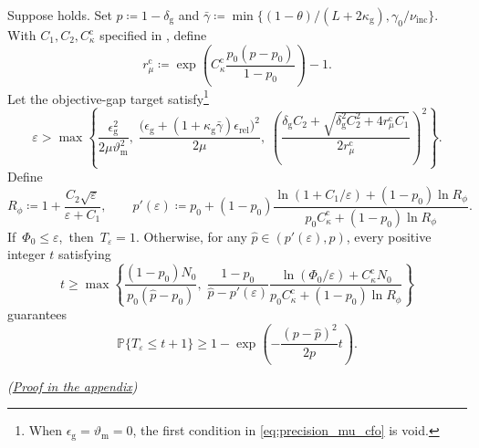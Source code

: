\documentclass{article}
\begin{document}
\begin{theorem}
\label{thm:mu_pos_cfo_bzo}
Suppose  holds. Set
\(p\coloneqq1-\delta_{\mathrm{g}}\) and
\(\bar\gamma\coloneqq\min\{(1-\theta)/(L+2\kappa_{\mathrm{g}}),
\gamma_0/\nu_{\mathrm{inc}}\}\).
With \(C_1,C_2,C_\kappa^{\mathrm{c}}\) specified in
, define
\begin{equation}\label{eq:constants_mu_cfo}
r_\mu^{\mathrm{c}}\coloneqq
\exp\!\left(C_\kappa^{\mathrm{c}}\frac{p_0(p-p_0)}{1-p_0}\right)-1.
\end{equation}
Let the objective-gap target
satisfy\footnote{When \(\epsilon_{\mathrm{g}}=\vartheta_{\mathrm{m}}=0\), the first
condition in \eqref{eq:precision_mu_cfo} is void.}
\begin{equation}\label{eq:precision_mu_cfo}
\varepsilon>\max\left\{
\frac{\epsilon_{\mathrm{g}}^2}{2\mu\vartheta_{\mathrm{m}}^2},\;
\frac{\bigl(\epsilon_{\mathrm{g}}+(1+\kappa_{\mathrm{g}}\bar\gamma)
\epsilon_{\mathrm{rel}}\bigr)^2}{2\mu},\;
\left(
\frac{\delta_{\mathrm{g}}C_2+
\sqrt{\delta_{\mathrm{g}}^2C_2^2+4r_\mu^{\mathrm{c}}C_1}}
{2r_\mu^{\mathrm{c}}}
\right)^2
\right\}.
\end{equation}
Define
\begin{equation}\label{eq:pprime_mu_cfo}
R_\phi\coloneqq1+\frac{C_2\sqrt\varepsilon}{\varepsilon+C_1},
\qquad
p'(\varepsilon)\coloneqq p_0+
(1-p_0)\frac{\ln(1+C_1/\varepsilon)+(1-p_0)\ln R_\phi}
{p_0C_\kappa^{\mathrm{c}}+(1-p_0)\ln R_\phi}.
\end{equation}
\mbox{If \(\Phi_0\le\varepsilon\), then \(T_\varepsilon=1\).} Otherwise,
for any \(\hat p\in(p'(\varepsilon),p)\), every positive integer
\(t\) satisfying
\begingroup{}
\begin{equation}\label{eq:complexity_mu_cfo}
t\ge\max\left\{
\frac{(1-p_0)N_0}{p_0(\hat p-p_0)},\;
\frac{1-p_0}{\hat p-p'(\varepsilon)}
\frac{\ln(\Phi_0/\varepsilon)+C_\kappa^{\mathrm{c}}N_0}
{p_0C_\kappa^{\mathrm{c}}+(1-p_0)\ln R_\phi}
\right\}
\end{equation}
guarantees
\begin{equation}\label{eq:probability_mu_cfo}
\mathbb P\{T_\varepsilon\le t+1\}
\ge
1-
\exp\left(
-\frac{(p-\hat p)^2}{2p}t
\right).
\end{equation}
\par\nobreak\hfill\textnormal{\small\itshape(\hyperref[proof:mu_pos_cfo_bzo]{Proof in the appendix})}\par
\endgroup
\end{theorem}
\end{document}
